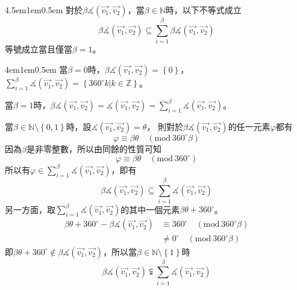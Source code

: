 \documentclass[12pt]{article}
\begin{document}
\begin{mybox}[允許3]{4.5em}{1em}{0.5em}
    對於$\beta\measuredangle{\left(\overrightarrow{v_1},\overrightarrow{v_2}\right)}$，當$\beta\in\mathbb{N}$時，以下不等式成立
    $$
        \beta\measuredangle{\left(\overrightarrow{v_1},\overrightarrow{v_2}\right)}
        \subseteq\sum\limits_{i=1}^{\beta}{\beta\measuredangle{\left(\overrightarrow{v_1},\overrightarrow{v_2}\right)}}
    $$
    等號成立當且僅當$\beta=1$。
\end{mybox}
\begin{mybox}[證明]{4em}{1em}{0.5em}
    當$\beta=0$時，$\beta\measuredangle{\left(\overrightarrow{v_1},\overrightarrow{v_2}\right)}=\left\{0\right\}$，
    $\sum\limits_{i=1}^{\beta}{\measuredangle{\left(\overrightarrow{v_1},\overrightarrow{v_2}\right)}}=\left\{360^{\circ}k\left|k\in\mathbb{Z}\right.\right\}$。
    
    當$\beta=1$時，$\beta\measuredangle{\left(\overrightarrow{v_1},\overrightarrow{v_2}\right)}
    =\measuredangle{\left(\overrightarrow{v_1},\overrightarrow{v_2}\right)}
    =\sum\limits_{i=1}^{\beta}{\measuredangle{\left(\overrightarrow{v_1},\overrightarrow{v_2}\right)}}$。

    當$\beta\in\mathbb{N}\setminus\left\{0,1\right\}$時，設$\measuredangle{\left(\overrightarrow{v_1},\overrightarrow{v_2}\right)}=\theta$，
    則對於$\beta\measuredangle{\left(\overrightarrow{v_1},\overrightarrow{v_2}\right)}$的任一元素$\varphi$都有
    $$
        \varphi\equiv\beta\theta\quad\left(\text{mod}\ {360^{\circ}\beta}\right)
    $$
    因為$\beta$是非零整數，所以由同餘的性質可知
    $$
        \varphi\equiv\beta\theta\quad\left(\text{mod}\ {360^{\circ}}\right)
    $$
    所以有$\varphi\in\sum\limits_{i=1}^{\beta}{\measuredangle{\left(\overrightarrow{v_1},\overrightarrow{v_2}\right)}}$，即有
    $$
        \beta\measuredangle{\left(\overrightarrow{v_1},\overrightarrow{v_2}\right)}
        \subseteq\sum\limits_{i=1}^{\beta}{\measuredangle{\left(\overrightarrow{v_1},\overrightarrow{v_2}\right)}}
    $$
    另一方面，取$\sum\limits_{i=1}^{\beta}{\measuredangle{\left(\overrightarrow{v_1},\overrightarrow{v_2}\right)}}$的其中一個元素$\beta\theta+360^{\circ}$。
    \begin{align*}
        \beta\theta+360^{\circ}-\beta\measuredangle{\left(\overrightarrow{v_1},\overrightarrow{v_2}\right)}&\equiv360^{\circ}\quad\left(\text{mod}\ {360^{\circ}\beta}\right)\\
        &\neq0^{\circ}\quad\left(\text{mod}\ {360^{\circ}\beta}\right)
    \end{align*}
    即$\beta\theta+360^{\circ}\notin\beta\measuredangle{\left(\overrightarrow{v_1},\overrightarrow{v_2}\right)}$，所以當$\beta\in\mathbb{N}\setminus\left\{1\right\}$時
    $$
        \beta\measuredangle{\left(\overrightarrow{v_1},\overrightarrow{v_2}\right)}
        \subsetneqq\sum\limits_{i=1}^{\beta}{\measuredangle{\left(\overrightarrow{v_1},\overrightarrow{v_2}\right)}}
    $$
\end{mybox}
\end{document}
